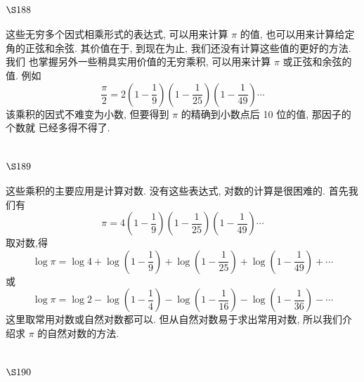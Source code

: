 \section{$\S 188$}

这些无穷多个因式相乘形式的表达式, 可以用来计算 $\pi$ 的值, 也可以用来计算给定 角的正弦和余弦. 其价值在于, 到现在为止, 我们还没有计算这些值的更好的方法. 我们 也掌握另外一些稍具实用价值的无穷乘积, 可以用来计算 $\pi$ 或正弦和余弦的值. 例如
\[
\frac{\pi}{2}=2\left(1-\frac{1}{9}\right)\left(1-\frac{1}{25}\right)\left(1-\frac{1}{49}\right) \cdots
\]
该乘积的因式不难变为小数, 但要得到 $\pi$ 的精确到小数点后 10 位的值, 那因子的个数就 已经多得不得了.

\section{$\S 189$}

这些乘积的主要应用是计算对数. 没有这些表达式, 对数的计算是很困难的. 首先我 们有
\[
\pi=4\left(1-\frac{1}{9}\right)\left(1-\frac{1}{25}\right)\left(1-\frac{1}{49}\right) \cdots
\]
取对数,得
\[
\log \pi=\log 4+\log \left(1-\frac{1}{9}\right)+\log \left(1-\frac{1}{25}\right)+\log \left(1-\frac{1}{49}\right)+\cdots
\]
或
\[
\log \pi=\log 2-\log \left(1-\frac{1}{4}\right)-\log \left(1-\frac{1}{16}\right)-\log \left(1-\frac{1}{36}\right)-\cdots
\]
这里取常用对数或自然对数都可以. 但从自然对数易于求出常用对数, 所以我们介绍求 $\pi$ 的自然对数的方法.

\section{$\S 190$}

